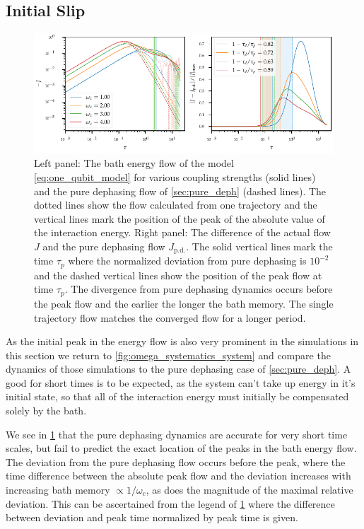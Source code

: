 \subsection{Initial Slip}
\label{sec:initial-slip-sb}
\begin{figure}[htp]
  \centering
  \includegraphics{figs/one_bath_syst/omega_initial_slip}
  \caption{\label{fig:omega_initial_slip} Left panel: The bath energy
    flow of the model \cref{eq:one_qubit_model} for various coupling
    strengths (solid lines) and the pure dephasing flow of
    \cref{sec:pure_deph} (dashed lines). The dotted lines show the
    flow calculated from one trajectory and the vertical lines mark
    the position of the peak of the absolute value of the interaction
    energy. Right panel: The difference of the actual flow \(J\) and
    the pure dephasing flow \(J_\mathrm{p.d.}\). The solid vertical
    lines mark the time \(τ_p\) where the normalized deviation from
    pure dephasing is \(10^{-2}\) and the dashed vertical lines show
    the position of the peak flow at time \(τ_p\). The divergence from
    pure dephasing dynamics occurs before the peak flow and the
    earlier the longer the bath memory. The single trajectory flow
    matches the converged flow for a longer period.}
\end{figure}

As the initial peak in the energy flow is also very prominent in the
simulations in this section we return to
\cref{fig:omega_systematics_system} and compare the dynamics of those
simulations to the pure dephasing case of \cref{sec:pure_deph}. A good
for short times is to be expected, as the system can't take up energy
in it's initial state, so that all of the interaction energy must
initially be compensated solely by the bath.

We see in \cref{fig:omega_initial_slip} that the pure dephasing
dynamics are accurate for very short time scales, but fail to predict
the exact location of the peaks in the bath energy flow. The deviation
from the pure dephasing flow occurs before the peak, where the time
difference between the absolute peak flow and the deviation increases
with increasing bath memory \(\propto 1/ω_c\), as does the magnitude
of the maximal relative deviation. This can be ascertained from the
legend of \cref{fig:omega_initial_slip} where the difference between
deviation and peak time normalized by peak time is given.


